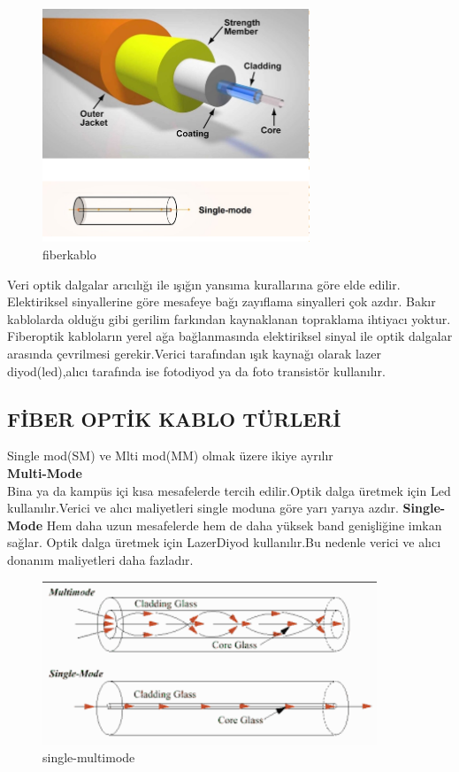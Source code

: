 \begin{figure}[H]
    \centering
    \includegraphics[width=8cm]{images/fiberoptik}
    \caption{fiberkablo}
    \label{fig:fiberoptikkablo}
\end{figure}

 Veri optik dalgalar arıcılığı ile ışığın yansıma kurallarına göre elde edilir.
 Elektiriksel sinyallerine göre mesafeye bağı zayıflama sinyalleri çok azdır.
 Bakır kablolarda olduğu gibi gerilim farkından kaynaklanan topraklama ihtiyacı yoktur.
 Fiberoptik kabloların yerel ağa bağlanmasında elektiriksel sinyal ile optik dalgalar arasında çevrilmesi gerekir.Verici tarafından ışık kaynağı olarak lazer diyod(led),alıcı tarafında ise fotodiyod ya da foto transistör kullanılır.
\subsection{FİBER OPTİK KABLO TÜRLERİ}
Single mod(SM) ve Mlti mod(MM) olmak üzere ikiye ayrılır\\
\textbf{Multi-Mode}\\
Bina ya da kampüs içi kısa mesafelerde tercih edilir.Optik dalga üretmek için Led kullanılır.Verici ve alıcı maliyetleri single moduna göre yarı yarıya azdır.
\textbf{Single-Mode}
Hem daha uzun mesafelerde hem de daha yüksek band genişliğine imkan sağlar.
Optik dalga üretmek için LazerDiyod kullanılır.Bu nedenle verici ve alıcı donanım maliyetleri daha fazladır.

\begin{figure}[ht]
    \centering
    \includegraphics[width=10cm]{images/single-multimode}
    \caption{single-multimode}
    \label{fig:single_multi_mode}
\end{figure}
